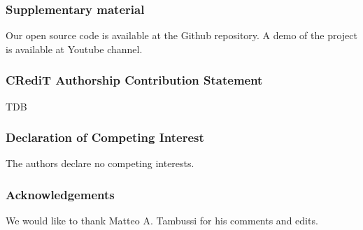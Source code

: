 \documentclass[runningheads]{llncs}
\begin{document}
\subsubsection{Supplementary material}
Our open source code is available at the Github repository. A demo of the project is available at Youtube channel.

\subsubsection{CRediT Authorship Contribution Statement}
TDB

\subsubsection{Declaration of Competing Interest}
The authors declare no competing interests.

\subsubsection{Acknowledgements} We would like to thank Matteo A. Tambussi for his comments and edits.

%
%


\end{document}
